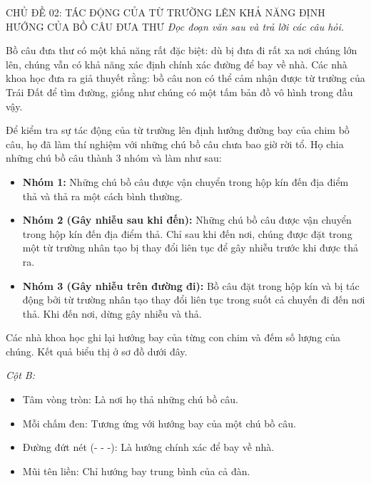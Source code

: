 \documentclass[12pt,a4paper,twoside]{article}
\newcounter{qcounter}
\newenvironment{readingpassage}[1][]{%
    \begin{tcolorbox}[enhanced, colback=grayLight, colframe=secondaryBlue,
        coltitle=textDark, fonttitle=\bfseries, title={#1},
        rounded corners, arc=3mm, boxrule=1pt,
        left=15pt, right=15pt, top=10pt, bottom=10pt,
        breakable, before skip=10pt, after skip=10pt, drop fuzzy shadow]
    \setstretch{1.3}
}{\end{tcolorbox}}
\begin{document}
\newpage
\setcounter{qcounter}{0}

\label{b1_cd02}
\begin{topicbox}{\large CHỦ ĐỀ 02: TÁC ĐỘNG CỦA TỪ TRƯỜNG LÊN KHẢ NĂNG ĐỊNH HƯỚNG CỦA BỒ CÂU ĐƯA THƯ}
\vspace{8pt}
\textit{Đọc đoạn văn sau và trả lời các câu hỏi.}
\vspace{6pt}
\end{topicbox}
\vspace{5pt}
\begin{readingpassage}[]
Bồ câu đưa thư có một khả năng rất đặc biệt: dù bị đưa đi rất xa nơi chúng lớn lên, chúng vẫn có khả năng xác định chính xác đường để bay về nhà. Các nhà khoa học đưa ra giả thuyết rằng: bồ câu non có thể cảm nhận được từ trường của Trái Đất để tìm đường, giống như chúng có một tấm bản đồ vô hình trong đầu vậy.

Để kiểm tra sự tác động của từ trường lên định hướng đường bay của chim bồ câu, họ đã làm thí nghiệm với những chú bồ câu chưa bao giờ rời tổ. Họ chia những chú bồ câu thành 3 nhóm và làm như sau:

\begin{itemize}[leftmargin=*, itemsep=3pt, label=\textcolor{accentBlue}{\textbf{--}}]
\item \textbf{Nhóm 1:} Những chú bồ câu được vận chuyển trong hộp kín đến địa điểm thả và thả ra một cách bình thường.
\item \textbf{Nhóm 2 (Gây nhiễu sau khi đến):} Những chú bồ câu được vận chuyển trong hộp kín đến địa điểm thả. Chỉ sau khi đến nơi, chúng được đặt trong một từ trường nhân tạo bị thay đổi liên tục để gây nhiễu trước khi được thả ra.
\item \textbf{Nhóm 3 (Gây nhiễu trên đường đi):} Bồ câu đặt trong hộp kín và bị tác động bởi từ trường nhân tạo thay đổi liên tục trong suốt cả chuyến đi đến nơi thả. Khi đến nơi, dừng gây nhiễu và thả.
\end{itemize}

Các nhà khoa học ghi lại hướng bay của từng con chim và đếm số lượng của chúng. Kết quả biểu thị ở sơ đồ dưới đây.

\vspace{4pt}
\textit{Cột B:}
\begin{itemize}[leftmargin=*, itemsep=2pt, label=\textcolor{accentBlue}{\textbf{--}}]
\item Tâm vòng tròn: Là nơi họ thả những chú bồ câu.
\item Mỗi chấm đen: Tương ứng với hướng bay của một chú bồ câu.
\item Đường đứt nét (- - -): Là hướng chính xác để bay về nhà.
\item Mũi tên liền: Chỉ hướng bay trung bình của cả đàn.
\end{itemize}


\end{readingpassage}
\end{document}

